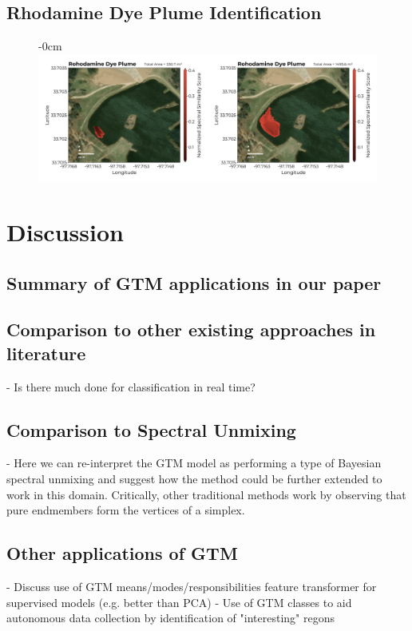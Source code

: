 \documentclass[remotesensing,article,submit,pdftex,moreauthors]{Definitions/mdpi}
\begin{document}
\subsection{Rhodamine Dye Plume Identification}

\begin{figure}[t]
\begin{adjustwidth}{-\extralength}{0cm}
\centering
\includegraphics[width=15.5cm]{paper/figures/results/rhodamine.png}
\end{adjustwidth}
\caption{\label{fig:rhodamine-map}}
\end{figure}  




\section{Discussion}

\subsection{Summary of GTM applications in our paper}
\subsection{Comparison to other existing approaches in literature}
- Is there much done for classification in real time? 
\subsection{Comparison to Spectral Unmixing}
- Here we can re-interpret the GTM model as performing a type of Bayesian spectral unmixing and suggest how the method could be further extended to work in this domain. Critically, other traditional methods work by observing that pure endmembers form the vertices of a simplex. 

\subsection{Other applications of GTM}
- Discuss use of GTM means/modes/responsibilities feature transformer for supervised models (e.g. better than PCA) 
- Use of GTM classes to aid autonomous data collection by identification of "interesting" regons
\end{document}
